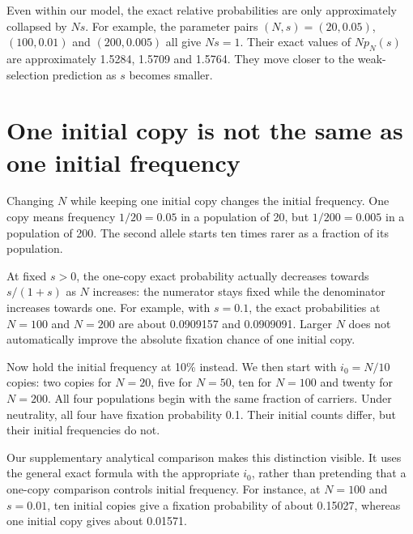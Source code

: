 Even within our model, the exact relative probabilities are only approximately collapsed by $Ns$. For example, the parameter pairs $(N,s)=(20,0.05)$, $(100,0.01)$ and $(200,0.005)$ all give $Ns=1$. Their exact values of $Np_N(s)$ are approximately 1.5284, 1.5709 and 1.5764. They move closer to the weak-selection prediction as $s$ becomes smaller.

\section{One initial copy is not the same as one initial frequency}

Changing $N$ while keeping one initial copy changes the initial frequency. One copy means frequency $1/20=0.05$ in a population of 20, but $1/200=0.005$ in a population of 200. The second allele starts ten times rarer as a fraction of its population.

At fixed $s>0$, the one-copy exact probability actually decreases towards $s/(1+s)$ as $N$ increases: the numerator stays fixed while the denominator increases towards one. For example, with $s=0.1$, the exact probabilities at $N=100$ and $N=200$ are about 0.0909157 and 0.0909091. Larger $N$ does not automatically improve the absolute fixation chance of one initial copy.

Now hold the initial frequency at 10\% instead. We then start with $i_0=N/10$ copies: two copies for $N=20$, five for $N=50$, ten for $N=100$ and twenty for $N=200$. All four populations begin with the same fraction of carriers. Under neutrality, all four have fixation probability 0.1. Their initial counts differ, but their initial frequencies do not.

Our supplementary analytical comparison makes this distinction visible. It uses the general exact formula with the appropriate $i_0$, rather than pretending that a one-copy comparison controls initial frequency. For instance, at $N=100$ and $s=0.01$, ten initial copies give a fixation probability of about 0.15027, whereas one initial copy gives about 0.01571.

